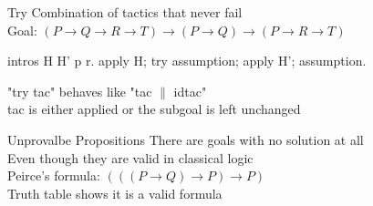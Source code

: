 \begin{frame}[fragile]{Try}
	Combination of tactics that never fail \\
	\pause
	\medskip
	Goal: $(P \rightarrow Q \rightarrow R \rightarrow T) \rightarrow (P \rightarrow Q) \rightarrow (P \rightarrow R \rightarrow T)$
	\pause
	\begin{user}
	intros H H' p r.
	apply H; try assumption; apply H'; assumption.
	\end{user}
	\pause
	"try tac" behaves like "tac $\|$ idtac"\\
	\pause
	\medskip
	tac is either applied or the subgoal is left unchanged
\end{frame}
\begin{frame}[fragile]{Unprovalbe Propositions}
	There are goals with no solution at all\\
	\pause
	\medskip
	Even though they are valid in classical logic\\
	\pause
	\medskip
	Peirce's formula: $(((P \rightarrow Q) \rightarrow P) \rightarrow P)$\\
	\pause
	\medskip
	Truth table shows it is a valid formula
\end{frame}

